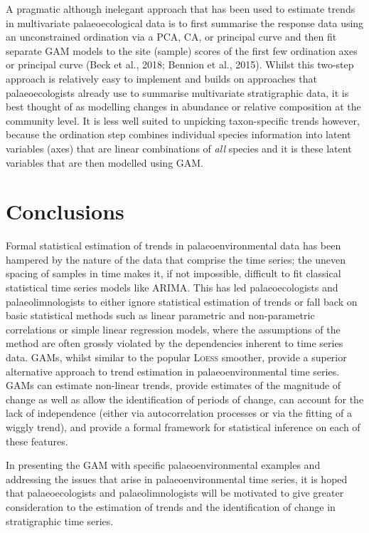 \documentclass[12pt,]{article}
\newcommand{\loess}{\textsc{Loess}}
\begin{document}
A pragmatic although inelegant approach that has been used to estimate
trends in multivariate palaeoecological data is to first summarise the
response data using an unconstrained ordination via a PCA, CA, or
principal curve and then fit separate GAM models to the site (sample)
scores of the first few ordination axes or principal curve (Beck et al.,
2018; Bennion et al., 2015). Whilst this two-step approach is relatively
easy to implement and builds on approaches that palaeoecologists already
use to summarise multivariate stratigraphic data, it is best thought of
as modelling changes in abundance or relative composition at the
community level. It is less well suited to unpicking taxon-specific
trends however, because the ordination step combines individual species
information into latent variables (axes) that are linear combinations of
\emph{all} species and it is these latent variables that are then
modelled using GAM.

\section{Conclusions}\label{conclusions}

Formal statistical estimation of trends in palaeoenvironmental data has
been hampered by the nature of the data that comprise the time series;
the uneven spacing of samples in time makes it, if not impossible,
difficult to fit classical statistical time series models like ARIMA.
This has led palaeoecologists and palaeolimnologists to either ignore
statistical estimation of trends or fall back on basic statistical
methods such as linear parametric and non-parametric correlations or
simple linear regression models, where the assumptions of the method are
often grossly violated by the dependencies inherent to time series data.
GAMs, whilst similar to the popular \loess{} smoother, provide a
superior alternative approach to trend estimation in palaeoenvironmental
time series. GAMs can estimate non-linear trends, provide estimates of
the magnitude of change as well as allow the identification of periods
of change, can account for the lack of independence (either via
autocorrelation processes or via the fitting of a wiggly trend), and
provide a formal framework for statistical inference on each of these
features.

In presenting the GAM with specific palaeoenvironmental examples and
addressing the issues that arise in palaeoenvironmental time series, it
is hoped that palaeoecologists and palaeolimnologists will be motivated
to give greater consideration to the estimation of trends and the
identification of change in stratigraphic time series.
\end{document}
